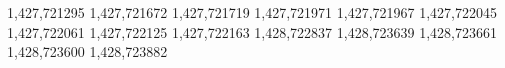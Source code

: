 1,427,721295
1,427,721672
1,427,721719
1,427,721971
1,427,721967
1,427,722045
1,427,722061
1,427,722125
1,427,722163
1,428,722837
1,428,723639
1,428,723661
1,428,723600
1,428,723882
